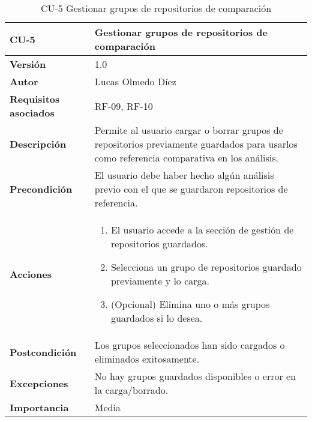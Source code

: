 \clearpage
\begin{table}[p]
    \centering
    \begin{tabularx}{\linewidth}{ p{} p{} }
        \toprule
        \textbf{CU-5} & Gestionar grupos de repositorios de comparación \\
        \midrule
        \textbf{Versión} & 1.0 \\
        \textbf{Autor} & Lucas Olmedo Díez \\
        \textbf{Requisitos asociados} & RF-09, RF-10 \\
        \textbf{Descripción} & Permite al usuario cargar o borrar grupos de repositorios previamente guardados para usarlos como referencia comparativa en los análisis. \\
        \textbf{Precondición} & El usuario debe haber hecho algún análisis previo con el que se guardaron repositorios de referencia. \\
        \textbf{Acciones} &
        \begin{enumerate}
            \def\labelenumi{\arabic{enumi}.}
            \tightlist
            \item El usuario accede a la sección de gestión de repositorios guardados.
            \item Selecciona un grupo de repositorios guardado previamente y lo carga.
            \item (Opcional) Elimina uno o más grupos guardados si lo desea.
        \end{enumerate}\\
        \textbf{Postcondición} & Los grupos seleccionados han sido cargados o eliminados exitosamente. \\
        \textbf{Excepciones} & No hay grupos guardados disponibles o error en la carga/borrado. \\
        \textbf{Importancia} & Media \\
        \bottomrule
    \end{tabularx}
    \caption{CU-5 Gestionar grupos de repositorios de comparación}
\end{table}

